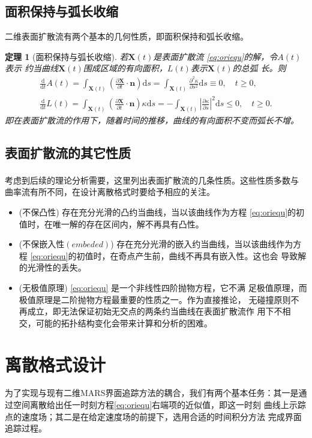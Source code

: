 \documentclass[a4paper,twoside]{ctexart}
\newtheorem{theorem}{定理}[section]
\newcommand{\pdfrac}[2]{\frac{\partial #1}{\partial #2}}
\begin{document}
\subsection{面积保持与弧长收缩}
二维表面扩散流有两个基本的几何性质，即面积保持和弧长收缩。
\begin{theorem}[面积保持与弧长收缩]若$\boldsymbol X(t)$是表面扩散流
  \eqref{eq:oriequ}的解，令$A(t)$表示
约当曲线$\boldsymbol X(t)$围成区域的有向面积，$L(t)$表示$\boldsymbol X(t)$的总弧
长。则
\begin{eqnarray}
  \label{eq:essgeo}
  \frac{\mathrm{d}}{\mathrm{d} t} A(t) =
  \int_{\boldsymbol X(t)}(\pdfrac{\boldsymbol X}{t} \cdot
  \boldsymbol n)\text{d} s =
  \int_{\boldsymbol X(t)}\frac{\partial^2\kappa}{\partial s^2} \text{d} s \equiv
  0, \quad t \ge 0 ,\\
  \frac{\mathrm{d}}{\mathrm{d} t} L(t) =
  \int_{\boldsymbol X(t)}(\pdfrac{\boldsymbol X}{t} \cdot \boldsymbol n)\kappa
  \text{d} s = -\int_{\boldsymbol X(t)}\left |\pdfrac{\kappa}{s}  \right
  |^2 \text{d} s
  \le 0, \quad t \ge 0.
\end{eqnarray}
即在表面扩散流的作用下，随着时间的推移，曲线的有向面积不变而弧长不增。
\end{theorem}

\subsection{表面扩散流的其它性质}
考虑到后续的理论分析需要，这里列出表面扩散流的几条性质\textsuperscript{\cite{ref5}}。这些性质多数与
曲率流有所不同，在设计离散格式时要给予相应的关注。
\begin{itemize}
\item (不保凸性) 存在充分光滑的凸约当曲线，当以该曲线作为方程
  \eqref{eq:oriequ}的初值时，在唯一解的存在区间内，解不再具有凸性。
\item (不保嵌入性$\left(embeded\right)$) 存在充分光滑的嵌入约当曲线，当以该曲线作为方程
  \eqref{eq:oriequ}的初值时，在奇点产生前，曲线不再具有嵌入性。这也会
  导致解的光滑性的丢失。
\item (无极值原理) \eqref{eq:oriequ} 是一个非线性四阶抛物方程，它不满
  足极值原理，而极值原理是二阶抛物方程最重要的性质之一。作为直接推论，
  无碰撞原则不再成立，即无法保证初始无交点的两条约当曲线在表面扩散流作
  用下不相交，可能的拓扑结构变化会带来计算和分析的困难。
\end{itemize}
\section{离散格式设计}
为了实现与现有二维MARS界面追踪方法的耦合，我们有两个基本任务：其一是通
过空间离散给出任一时刻方程\eqref{eq:oriequ}右端项的近似值，即这一时刻
曲线上示踪点的速度场；其二是在给定速度场的前提下，选用合适的时间积分方法
完成界面追踪过程。
\end{document}
